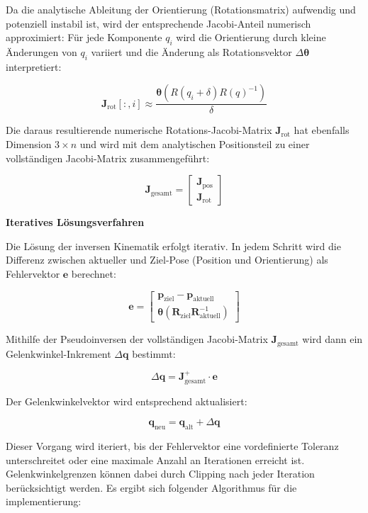 Da die analytische Ableitung der Orientierung (Rotationsmatrix) aufwendig und potenziell instabil ist, wird der entsprechende Jacobi-Anteil numerisch approximiert:
Für jede Komponente $q_i$ wird die Orientierung durch kleine Änderungen von $q_i$ variiert und die Änderung als Rotationsvektor $\Delta \boldsymbol{\theta}$ interpretiert:

\[
\mathbf{J}_{\text{rot}}[:,i] \approx \frac{\boldsymbol{\theta}(R(q_i + \delta) R(q)^{-1})}{\delta}
\]

Die daraus resultierende numerische Rotations-Jacobi-Matrix $\mathbf{J}_{\text{rot}}$ hat ebenfalls Dimension $3 \times n$ und wird mit dem analytischen Positionsteil zu einer vollständigen Jacobi-Matrix zusammengeführt:

\[
\mathbf{J}_{\text{gesamt}} =
\begin{bmatrix}
\mathbf{J}_{\text{pos}} \\
\mathbf{J}_{\text{rot}}
\end{bmatrix}
\]

\vspace{1em}
\noindent
\textbf{Iteratives Lösungsverfahren}

Die Lösung der inversen Kinematik erfolgt iterativ. In jedem Schritt wird die Differenz zwischen aktueller und Ziel-Pose (Position und Orientierung) als Fehlervektor $\mathbf{e}$ berechnet:

\[
\mathbf{e} =
\begin{bmatrix}
\mathbf{p}_{\text{ziel}} - \mathbf{p}_{\text{aktuell}} \\
\boldsymbol{\theta}(\mathbf{R}_{\text{ziel}} \mathbf{R}_{\text{aktuell}}^{-1})
\end{bmatrix}
\]

Mithilfe der Pseudoinversen der vollständigen Jacobi-Matrix $\mathbf{J}_{\text{gesamt}}$ wird dann ein Gelenkwinkel-Inkrement $\Delta \mathbf{q}$ bestimmt:

\[
\Delta \mathbf{q} = \mathbf{J}_{\text{gesamt}}^{+} \cdot \mathbf{e}
\]

Der Gelenkwinkelvektor wird entsprechend aktualisiert:

\[
\mathbf{q}_{\text{neu}} = \mathbf{q}_{\text{alt}} + \Delta \mathbf{q}
\]

Dieser Vorgang wird iteriert, bis der Fehlervektor eine vordefinierte Toleranz unterschreitet oder eine maximale Anzahl an Iterationen erreicht ist.
Gelenkwinkelgrenzen können dabei durch Clipping nach jeder Iteration berücksichtigt werden.
Es ergibt sich folgender Algorithmus für die implementierung:


